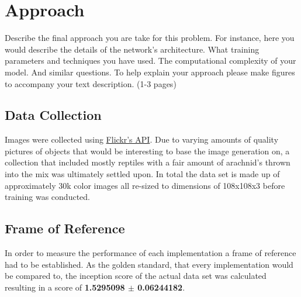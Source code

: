 
\section{Approach}

Describe the final approach you are take for this problem.
For instance, here you would describe the details of the network’s
architecture. What training parameters and techniques you have used.
The computational complexity of your model. And similar questions.
To help explain your approach please make figures to accompany your
text description. (1-3 pages)

\subsection{Data Collection}
Images were collected using \href{https://www.flickr.com/services/api/}{Flickr's API}. Due to varying amounts of quality pictures of objects that would be interesting to base the image generation on, a collection that included mostly reptiles with a fair amount of arachnid's thrown into the mix was ultimately settled upon. In total the data set is made up of approximately 30k color images all re-sized to dimensions of 108x108x3 before training was conducted. 


\subsection{Frame of Reference}
In order to measure the performance of each implementation a frame of reference had to be established. As the golden standard, that every implementation would be compared to, the inception score of the actual data set was calculated resulting in a score of \textbf{1.5295098 $\pm$ 0.06244182}.

